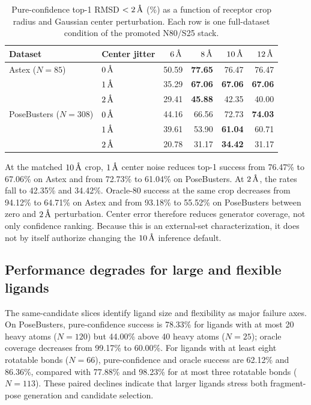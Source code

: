 \begin{table}[H]
    \centering
    \caption{Pure-confidence top-1 RMSD \(<2\,\text{\normalfont\AA}\) (\%) as a function
    of receptor crop radius and Gaussian center perturbation. Each row is one
    full-dataset condition of the promoted N80/S25 stack.}
    \label{tab:pocket_sensitivity}
    \begingroup
    \small
    \setlength{\tabcolsep}{8pt}
    \begin{tabular}{llrrrr}
        \toprule
        Dataset & Center jitter & \(6\,\text{\normalfont\AA}\) & \(8\,\text{\normalfont\AA}\) &
        \(10\,\text{\normalfont\AA}\) & \(12\,\text{\normalfont\AA}\) \\
        \midrule
        Astex (\(N=85\)) & \(0\,\text{\normalfont\AA}\) & 50.59 & \textbf{77.65} & 76.47 & 76.47 \\
        & \(1\,\text{\normalfont\AA}\) & 35.29 & \textbf{67.06} & \textbf{67.06} & \textbf{67.06} \\
        & \(2\,\text{\normalfont\AA}\) & 29.41 & \textbf{45.88} & 42.35 & 40.00 \\
        \addlinespace
        PoseBusters (\(N=308\)) & \(0\,\text{\normalfont\AA}\) & 44.16 & 66.56 & 72.73 & \textbf{74.03} \\
        & \(1\,\text{\normalfont\AA}\) & 39.61 & 53.90 & \textbf{61.04} & 60.71 \\
        & \(2\,\text{\normalfont\AA}\) & 20.78 & 31.17 & \textbf{34.42} & 31.17 \\
        \bottomrule
    \end{tabular}
    \endgroup
\end{table}

At the matched \(10\,\text{\normalfont\AA}\) crop, \(1\,\text{\normalfont\AA}\) center noise reduces
top-1 success from 76.47\% to 67.06\% on Astex and from 72.73\% to 61.04\%
on PoseBusters. At \(2\,\text{\normalfont\AA}\), the rates fall to 42.35\% and 34.42\%.
Oracle-80 success at the same crop decreases from 94.12\% to 64.71\% on
Astex and from 93.18\% to 55.52\% on PoseBusters between zero and
\(2\,\text{\normalfont\AA}\) perturbation. Center error therefore reduces generator
coverage, not only confidence ranking. Because this is an external-set
characterization, it does not by itself authorize changing the
\(10\,\text{\normalfont\AA}\) inference default.

\subsection{Performance degrades for large and flexible ligands}

The same-candidate slices identify ligand size and flexibility as major failure
axes. On PoseBusters, pure-confidence success is 78.33\% for ligands with at
most 20 heavy atoms (\(N=120\)) but 44.00\% above 40 heavy atoms (\(N=25\));
oracle coverage decreases from 99.17\% to 60.00\%. For ligands with at least
eight rotatable bonds (\(N=66\)), pure-confidence and oracle success are
62.12\% and 86.36\%, compared with 77.88\% and 98.23\% for at most three
rotatable bonds (\(N=113\)). These paired declines indicate that larger
ligands stress both fragment-pose generation and candidate selection.

